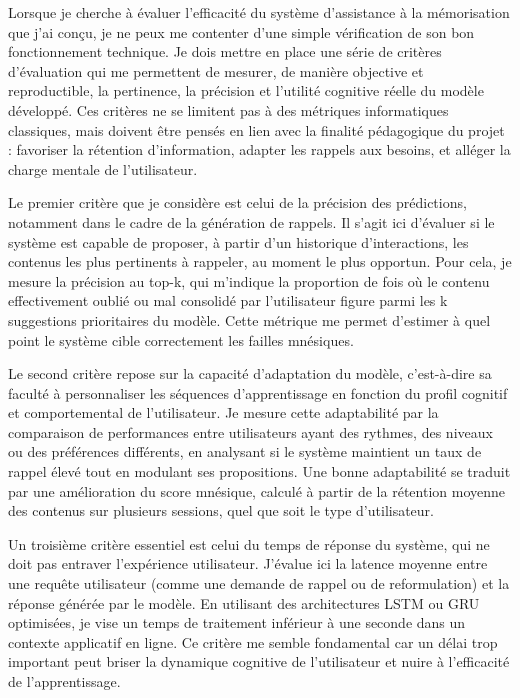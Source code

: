 \documentclass[11pt,a4paper]{report}
\begin{document}
Lorsque je cherche à évaluer l’efficacité du système d’assistance à la mémorisation que j’ai conçu, je ne peux me contenter d’une simple vérification de son bon fonctionnement technique. Je dois mettre en place une série de critères d’évaluation qui me permettent de mesurer, de manière objective et reproductible, la pertinence, la précision et l’utilité cognitive réelle du modèle développé. Ces critères ne se limitent pas à des métriques informatiques classiques, mais doivent être pensés en lien avec la finalité pédagogique du projet : favoriser la rétention d’information, adapter les rappels aux besoins, et alléger la charge mentale de l’utilisateur.

Le premier critère que je considère est celui de la précision des prédictions, notamment dans le cadre de la génération de rappels. Il s’agit ici d’évaluer si le système est capable de proposer, à partir d’un historique d’interactions, les contenus les plus pertinents à rappeler, au moment le plus opportun. Pour cela, je mesure la précision au top-k, qui m’indique la proportion de fois où le contenu effectivement oublié ou mal consolidé par l’utilisateur figure parmi les k suggestions prioritaires du modèle. Cette métrique me permet d’estimer à quel point le système cible correctement les failles mnésiques.

Le second critère repose sur la capacité d’adaptation du modèle, c’est-à-dire sa faculté à personnaliser les séquences d’apprentissage en fonction du profil cognitif et comportemental de l’utilisateur. Je mesure cette adaptabilité par la comparaison de performances entre utilisateurs ayant des rythmes, des niveaux ou des préférences différents, en analysant si le système maintient un taux de rappel élevé tout en modulant ses propositions. Une bonne adaptabilité se traduit par une amélioration du score mnésique, calculé à partir de la rétention moyenne des contenus sur plusieurs sessions, quel que soit le type d’utilisateur.

Un troisième critère essentiel est celui du temps de réponse du système, qui ne doit pas entraver l’expérience utilisateur. J’évalue ici la latence moyenne entre une requête utilisateur (comme une demande de rappel ou de reformulation) et la réponse générée par le modèle. En utilisant des architectures LSTM ou GRU optimisées, je vise un temps de traitement inférieur à une seconde dans un contexte applicatif en ligne. Ce critère me semble fondamental car un délai trop important peut briser la dynamique cognitive de l’utilisateur et nuire à l’efficacité de l’apprentissage.
\end{document}
